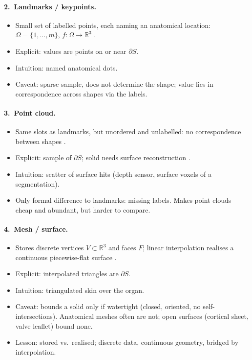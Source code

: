 %
\paragraph{2.~Landmarks / keypoints.}
\begin{itemize}
    \item Small set of labelled points, each naming an anatomical location: $\Omega = \{1,\dots,m\}$, $f : \Omega \to \mathbb{R}^3$ \citep{cootes1995active}.
    \item Explicit: values are points on or near $\partial S$.
    \item Intuition: named anatomical dots.
    \item Caveat: sparse sample, does not determine the shape; value lies in correspondence across shapes via the labels.
\end{itemize}

%
\paragraph{3.~Point cloud.}
\begin{itemize}
    \item Same slots as landmarks, but unordered and unlabelled: no correspondence between shapes \citep{qi2017pointnet, wang2019dgcnn}.
    \item Explicit: sample of $\partial S$; solid needs surface reconstruction \citep{kazhdan2006poisson}.
    \item Intuition: scatter of surface hits (depth sensor, surface voxels of a segmentation).
    \item Only formal difference to landmarks: missing labels. Makes point clouds cheap and abundant, but harder to compare.
\end{itemize}

%
\paragraph{4.~Mesh / surface.}
\begin{itemize}
    \item Stores discrete vertices $V \subset \mathbb{R}^3$ and faces $F$; linear interpolation realises a continuous piecewise-flat surface \citep{lorensen1987marching}.
    \item Explicit: interpolated triangles are $\partial S$.
    \item Intuition: triangulated skin over the organ.
    \item Caveat: bounds a solid only if watertight (closed, oriented, no self-intersections). Anatomical meshes often are not; open surfaces (cortical sheet, valve leaflet) bound none.
    \item Lesson: stored vs.\ realised; discrete data, continuous geometry, bridged by interpolation.
\end{itemize}

